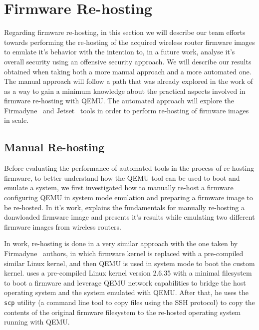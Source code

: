\section{Firmware Re-hosting}

Regarding firmware re-hosting, in this section we will describe our team efforts towards performing the re-hosting of the acquired wireless router firmware images to emulate it's behavior with the intention to, in a future work, analyse it's overall security using an offensive security approach. We will describe our results obtained when taking both a more manual approach and a more automated one. The manual approach will follow a path that was already explored in the work of \cite{victor-sales} as a way to gain a minimum knowledge about the practical aspects involved in firmware re-hosting with QEMU. The automated approach will explore the Firmadyne~\cite{firmadyne} and Jetset~\cite{jetset} tools in order to perform re-hosting of firmware images in scale.

\subsection{Manual Re-hosting}
\label{sec:manual-rehosting}

Before evaluating the performance of automated tools in the process of re-hosting firmware, to better understand how the QEMU tool can be used to boot and emulate a system, we first investigated how to manually re-host a firmware configuring QEMU in system mode emulation and preparing a firmware image to be re-hosted. In it's work, \cite{victor-sales} explains the fundamentals for manually re-hosting a donwloaded firmware image and presents it's results while emulating two different firmware images from wireless routers.

In \cite{victor-sales} work, re-hosting is done in a very similar approach with the one taken by Firmadyne~\cite{firmadyne} authors, in which firmware kernel is replaced with a pre-compiled similar Linux kernel, and then QEMU is used in system mode to boot the custom kernel. \cite{victor-sales} uses a pre-compiled Linux kernel version 2.6.35 with a minimal filesystem to boot a firmware and leverage QEMU network capabilities to bridge the host operating system and the system emulated with QEMU. After that, he uses the {\tt scp} utility (a command line tool to copy files using the SSH protocol) to copy the contents of the original firmware filesystem to the re-hosted operating system running with QEMU.

